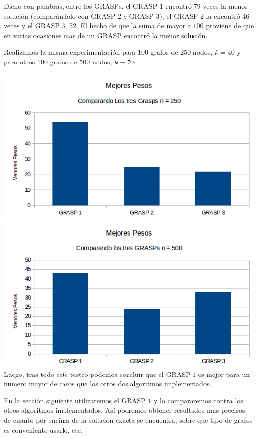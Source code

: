Dicho con palabras, entre los GRASPs, el GRASP 1 encontró 79 veces la menor solución (comparándolo con GRASP 2 y GRASP 3), el GRASP 2 la encontró 46 veces y el GRASP 3, 52. El hecho de que la suma de mayor a $100$ proviene de que en varias ocasiones mas de un GRASP encontró la menor solución.

Realizamos la misma experimentación para $100$ grafos de $250$ nodos, $k = 40$ y para otros $100$ grafos de $500$ nodos, $k = 70$:

\includegraphics[scale=0.7]{Ej5/CompetenciaGRASPs2.png}\\

\includegraphics[scale=0.7]{Ej5/CompetenciaGRASPs3.png}\\

Luego, tras todo este testeo podemos concluir que el GRASP $1$ es mejor para un numero mayor de casos que los otros dos algoritmos implementados.

En la sección siguiente utilizaremos el GRASP $1$ y lo compararemos contra los otros algoritmos implementados. Así podremos obtener resultados mas precisos de cuanto por encima de la solución exacta se encuentra, sobre que tipo de grafos es conveniente usarlo, etc.